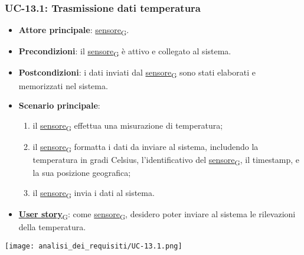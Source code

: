 \subsubsection{UC-13.1: Trasmissione dati temperatura}
\begin{itemize}
	\item \textbf{Attore principale}: \href{https://7last.github.io/docs/pb/documentazione-interna/glossario\#sensore}{sensore\textsubscript{G}}.
	\item \textbf{Precondizioni}: il \href{https://7last.github.io/docs/pb/documentazione-interna/glossario\#sensore}{sensore\textsubscript{G}} è attivo e collegato al sistema.
	\item \textbf{Postcondizioni}: i dati inviati dal \href{https://7last.github.io/docs/pb/documentazione-interna/glossario\#sensore}{sensore\textsubscript{G}} sono stati elaborati e memorizzati nel sistema.
	\item \textbf{Scenario principale}:
	      \begin{enumerate}
		      \item il \href{https://7last.github.io/docs/pb/documentazione-interna/glossario\#sensore}{sensore\textsubscript{G}} effettua una misurazione di temperatura;
		      \item il \href{https://7last.github.io/docs/pb/documentazione-interna/glossario\#sensore}{sensore\textsubscript{G}} formatta i dati da inviare al sistema, includendo la temperatura in gradi Celsius, l'identificativo del \href{https://7last.github.io/docs/pb/documentazione-interna/glossario\#sensore}{sensore\textsubscript{G}},
		            il timestamp, e la sua posizione geografica;
		      \item il \href{https://7last.github.io/docs/pb/documentazione-interna/glossario\#sensore}{sensore\textsubscript{G}} invia i dati al sistema.
	      \end{enumerate}
	\item \href{https://7last.github.io/docs/pb/documentazione-interna/glossario\#user-story}{\textbf{User story}\textsubscript{G}}: come \href{https://7last.github.io/docs/pb/documentazione-interna/glossario\#sensore}{sensore\textsubscript{G}}, desidero poter inviare al sistema le rilevazioni della temperatura.
\end{itemize}

\begin{center}
	\texttt{[image: analisi\_dei\_requisiti/UC-13.1.png]}
\end{center}

